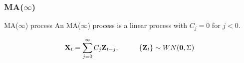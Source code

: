 \documentclass{beamer}
\begin{document}

\begin{frame}
\frametitle{MA($\infty$)}

\begin{block}{MA($\infty$) process}
An MA($\infty$) process is a linear process with $C_j = 0$ for $j < 0$.

\[
\mathbf{X}_t = \sum_{j=0}^{\infty}C_j \mathbf{Z}_{t-j}, \hspace{10mm} \{\mathbf{Z}_t\} \sim WN(\mathbf{0},\Sigma)
\]

\end{block}

\end{frame}
\end{document}
